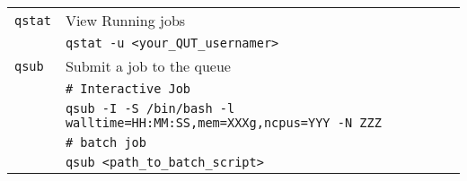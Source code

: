 \begin{table}[!h]
\begin{tabular}{ L{3cm}  L{9cm}}
    \texttt{qstat} & View Running jobs \\
                     & \texttt{qstat -u <your\_QUT\_usernamer>}
    \\[2ex]
    \texttt{qsub} & Submit a job to the queue\\
                     & \texttt{\# Interactive Job}
    \\
                     & \texttt{qsub -I -S /bin/bash -l walltime=HH:MM:SS,mem=XXXg,ncpus=YYY -N ZZZ}
    \\
                     & \texttt{\# batch job}
    \\
    & \texttt{qsub <path\_to\_batch\_script>}
      \\
    \hline
  \end{tabular}
\end{table}
